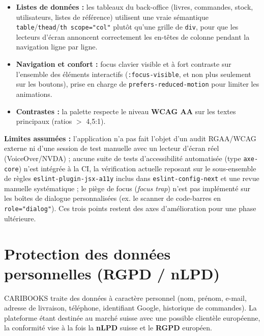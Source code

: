 \documentclass[12pt, a4paper]{report}
\renewcommand{\_}{\origunderscore\allowbreak}
\begin{document}
\begin{itemize}
    \item \textbf{Listes de données :} les tableaux du back-office (livres, commandes, stock, utilisateurs, listes de référence) utilisent une vraie sémantique \texttt{table}/\texttt{thead}/\texttt{th scope="col"} plutôt qu'une grille de \texttt{div}, pour que les lecteurs d'écran annoncent correctement les en-têtes de colonne pendant la navigation ligne par ligne.
    \item \textbf{Navigation et confort :} focus clavier visible et à fort contraste sur l'ensemble des éléments interactifs (\texttt{:focus-visible}, et non plus seulement sur les boutons), prise en charge de \texttt{prefers-reduced-motion} pour limiter les animations.
    \item \textbf{Contrastes :} la palette respecte le niveau \textbf{WCAG AA} sur les textes principaux (ratios $>$ 4{,}5:1).
\end{itemize}

\noindent \textbf{Limites assumées :} l'application n'a pas fait l'objet d'un audit RGAA/WCAG externe ni d'une session de test manuelle avec un lecteur d'écran réel (VoiceOver/NVDA) ; aucune suite de tests d'accessibilité automatisée (type \texttt{axe-core}) n'est intégrée à la CI, la vérification actuelle reposant sur le sous-ensemble de règles \texttt{eslint-plugin-jsx-a11y} inclus dans \texttt{eslint-config-next} et une revue manuelle systématique ; le piège de focus (\textit{focus trap}) n'est pas implémenté sur les boîtes de dialogue personnalisées (ex. le scanner de code-barres en \texttt{role="dialog"}). Ces trois points restent des axes d'amélioration pour une phase ultérieure.

\section{Protection des données personnelles (RGPD / nLPD)}

CARIBOOKS traite des données à caractère personnel (nom, prénom, e-mail, adresse de livraison, téléphone, identifiant Google, historique de commandes). La plateforme étant destinée au marché suisse avec une possible clientèle européenne, la conformité vise à la fois la \textbf{nLPD} suisse et le \textbf{RGPD} européen.
\end{document}
